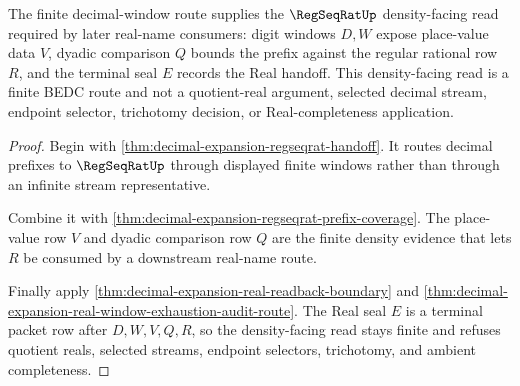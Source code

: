 \begin{theorem}
\label{thm:decimal-expansion-regseqrat-density-unblock}
The finite decimal-window route supplies the $\RegSeqRatUp$ density-facing read required by later real-name consumers: digit windows $D,W$ expose place-value data $V$, dyadic comparison $Q$ bounds the prefix against the regular rational row $R$, and the terminal seal $E$ records the Real handoff. This density-facing read is a finite BEDC route and not a quotient-real argument, selected decimal stream, endpoint selector, trichotomy decision, or Real-completeness application.
\end{theorem}
\begin{proof}
Begin with \autoref{thm:decimal-expansion-regseqrat-handoff}. It routes decimal prefixes to $\RegSeqRatUp$ through displayed finite windows rather than through an infinite stream representative.

Combine it with \autoref{thm:decimal-expansion-regseqrat-prefix-coverage}. The place-value row $V$ and dyadic comparison row $Q$ are the finite density evidence that lets $R$ be consumed by a downstream real-name route.

Finally apply \autoref{thm:decimal-expansion-real-readback-boundary} and \autoref{thm:decimal-expansion-real-window-exhaustion-audit-route}. The Real seal $E$ is a terminal packet row after $D,W,V,Q,R$, so the density-facing read stays finite and refuses quotient reals, selected streams, endpoint selectors, trichotomy, and ambient completeness.
\end{proof}

